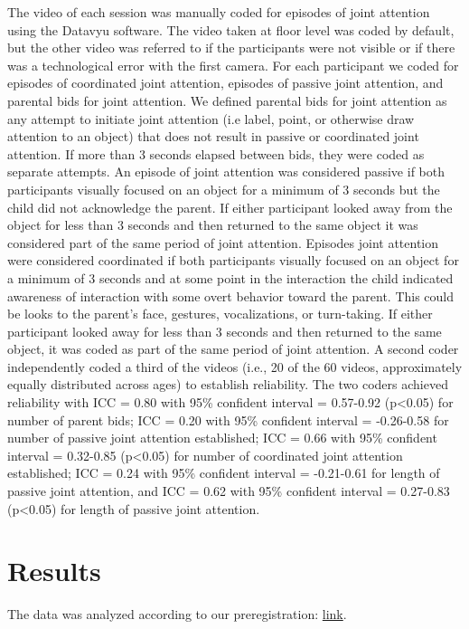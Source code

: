\documentclass[10pt, letterpaper]{article}
\begin{document}
The video of each session was manually coded for episodes of joint
attention using the Datavyu software. The video taken at floor level was
coded by default, but the other video was referred to if the
participants were not visible or if there was a technological error with
the first camera. For each participant we coded for episodes of
coordinated joint attention, episodes of passive joint attention, and
parental bids for joint attention. We defined parental bids for joint
attention as any attempt to initiate joint attention (i.e label, point,
or otherwise draw attention to an object) that does not result in
passive or coordinated joint attention. If more than 3 seconds elapsed
between bids, they were coded as separate attempts. An episode of joint
attention was considered passive if both participants visually focused
on an object for a minimum of 3 seconds but the child did not
acknowledge the parent. If either participant looked away from the
object for less than 3 seconds and then returned to the same object it
was considered part of the same period of joint attention. Episodes
joint attention were considered coordinated if both participants
visually focused on an object for a minimum of 3 seconds and at some
point in the interaction the child indicated awareness of interaction
with some overt behavior toward the parent. This could be looks to the
parent's face, gestures, vocalizations, or turn-taking. If either
participant looked away for less than 3 seconds and then returned to the
same object, it was coded as part of the same period of joint attention.
A second coder independently coded a third of the videos (i.e., 20 of
the 60 videos, approximately equally distributed across ages) to
establish reliability. The two coders achieved reliability with ICC =
0.80 with 95\% confident interval = 0.57-0.92 (p\textless{}0.05) for
number of parent bids; ICC = 0.20 with 95\% confident interval =
-0.26-0.58 for number of passive joint attention established; ICC = 0.66
with 95\% confident interval = 0.32-0.85 (p\textless{}0.05) for number
of coordinated joint attention established; ICC = 0.24 with 95\%
confident interval = -0.21-0.61 for length of passive joint attention,
and ICC = 0.62 with 95\% confident interval = 0.27-0.83
(p\textless{}0.05) for length of passive joint attention.

\section{Results}\label{results}

The data was analyzed according to our preregistration:
\href{https://osf.io/2bpdf/}{link}.
\end{document}
